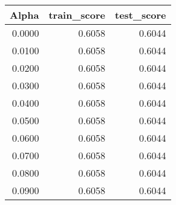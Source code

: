 \begin{tabular}{rrr}
\toprule
 Alpha &  train\_score &  test\_score \\
\midrule
0.0000 &       0.6058 &      0.6044 \\
0.0100 &       0.6058 &      0.6044 \\
0.0200 &       0.6058 &      0.6044 \\
0.0300 &       0.6058 &      0.6044 \\
0.0400 &       0.6058 &      0.6044 \\
0.0500 &       0.6058 &      0.6044 \\
0.0600 &       0.6058 &      0.6044 \\
0.0700 &       0.6058 &      0.6044 \\
0.0800 &       0.6058 &      0.6044 \\
0.0900 &       0.6058 &      0.6044 \\
\bottomrule
\end{tabular}
